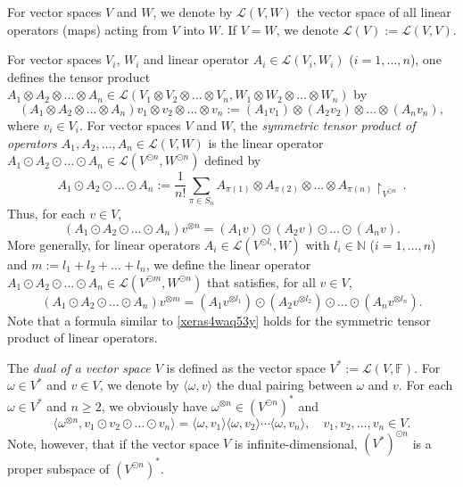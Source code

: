 \documentclass[12pt]{article}
\theoremstyle{remark}
\theoremstyle{remark}
\theoremstyle{remark}
\begin{document}
For vector spaces $V$ and $W$, we denote by $\mathcal L(V,W)$ the vector space of all linear operators (maps) acting from $V$ into $W$. If $V=W$, we denote $\mathcal L(V):=\mathcal L(V,V)$. 

For vector spaces $V_i$, $W_i$ and linear operator $A_i\in\mathcal L(V_i,W_i)$ ($i=1,\dots,n$), one defines the tensor product $A_1\otimes A_2\otimes\dots\otimes A_n\in\mathcal L(V_1\otimes V_2\otimes\dots\otimes V_n, W_1\otimes W_2\otimes\dots\otimes W_n)$  by
\begin{equation*}
(A_1\otimes A_2\otimes\dots\otimes A_n)v_1\otimes v_2\otimes\dots\otimes v_n:=(A_1v_1)\otimes (A_2v_2)\otimes\dots\otimes(A_nv_n),\end{equation*}
where $v_i\in V_i$. For vector spaces $V$ and $W$, the  {\it symmetric tensor product of  operators $A_1,A_2,\dots,A_n\in\mathcal L(V,W)$} is    the linear operator $A_1\odot A_2\odot\dots\odot A_n\in\mathcal L(V^{\odot n},W^{\odot n})$ defined  by
\begin{equation*} A_1\odot A_2\odot\dots\odot A_n:= \frac1{n!}\sum_{\pi\in S_n}A_{\pi(1)}\otimes A_{\pi(2)}\otimes \dots \otimes A_{\pi(n)}\restriction_{V^{\odot n}}\,.\end{equation*}
Thus, for each $v\in V$,
\begin{equation*}
(A_1\odot A_2\odot\dots\odot A_n)v^{\otimes n}=(A_1v)\odot(A_2v)\odot\dots\odot(A_nv).
\end{equation*}
More generally, for linear operators $A_i\in\mathcal L(V^{\odot l_i},W)$ with $l_i\in\mathbb N$ ($i=1,\dots,n$) and $m:=l_1+l_2+\dots+l_n$, we define the linear operator $A_1\odot A_2\odot\dots\odot A_n\in\mathcal L(V^{\odot m},W^{\odot n})$ that satisfies, for all $v\in V$,
\begin{equation}\label{dxzdszsrerawr4}
(A_1\odot A_2\odot\dots\odot A_n)v^{\otimes m}
=(A_1v^{\otimes l_1})\odot(A_2v^{\otimes l_2})\odot\dots\odot(A_nv^{\otimes l_n}).
\end{equation}
Note that a formula similar to \eqref{xeras4waq53y} holds for the symmetric tensor product of linear operators. 

The  {\it dual of a vector space $V$} is defined as the vector space $V^*:=\mathcal L(V,\mathbb F)$. For $\omega\in V^*$ and $v\in V$, we  denote by $\langle\omega,v\rangle$ the dual pairing between $\omega$ and $v$. For each $\omega\in V^*$ and $n\ge 2$, we obviously have $\omega^{\otimes n}\in (V^{\odot n})^*$ and 
$$\langle\omega^{\otimes n},v_1\odot v_2\odot\dots\odot v_n\rangle=\langle\omega,v_1\rangle\langle\omega,v_2\rangle\dotsm \langle\omega,v_n\rangle,\quad v_1,v_2,\dots,v_n\in V.$$
Note, however, that if the vector space $V$ is infinite-dimensional, $(V^*)^{\odot n}$ is a proper subspace of $(V^{\odot n})^*$.
\end{document}

